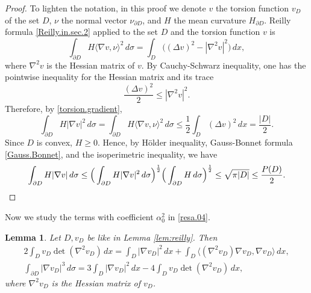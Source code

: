 \documentclass[10pt,reqno,a4paper]{article}
\numberwithin{equation}{section}
\theoremstyle{plain}
\newtheorem{lemma}[theorem]{Lemma}
\theoremstyle{definition}
\newcommand{\la}{\langle}
\newcommand{\ra}{\rangle}
\newcommand{\pa}{\partial}
\newcommand{\grad}{\nabla}
\begin{document}
\begin{proof} 
To lighten the notation, in this proof we denote $v$ the torsion function $v_D$ of the set $D$, 
$\nu$ the normal vector $\nu_{\pa D}$, 
and $H$ the mean curvature $H_{\pa D}$. 
Reilly formula \eqref{Reilly.in.sec.2} applied to the set $D$ 
and the torsion function $v$ is
\[
\int_{\pa D} H \la \grad v, \nu \ra^2\, d\sigma 
= \int_D \Big( (\Delta v)^2 - |\nabla^2 v|^2 \Big) \, dx,
\]
where $\grad^2 v$ is the Hessian matrix of $v$. 
By Cauchy-Schwarz inequality, 
one has the pointwise inequality for the Hessian matrix and its trace 
\[
\frac{(\Delta v)^2}{2} \leq	 |\nabla^2 v|^2.
\]
Therefore, by \eqref{torsion.gradient},
\[
\int_{\pa D} H |\nabla v|^2\, d\sigma 
= \int_{\pa D} H \la \grad v , \nu \ra^2 \, d\sigma 
\leq \frac12 \int_D (\Delta v)^2\, dx
= \frac{|D|}{2}.
\]
Since $D$ is convex, $H \geq 0$.
Hence, by H\"older inequality, Gauss-Bonnet formula \eqref{Gauss.Bonnet}, 
and the isoperimetric inequality, we have
\[
\int_{\pa D} H |\nabla v|\, d\sigma
\leq \Big( \int_{\pa D} H |\nabla v|^2\, d\sigma \Big)^\frac12 
\Big( \int_{\pa D} H \, d\sigma \Big)^\frac12  
\leq \sqrt{\pi |D|}
\leq \frac{P(D)}{2}. 
\qedhere
\]
\end{proof}

Now we study the terms with coefficient $\alpha_0^2$ in \eqref{resa.04}. %

\begin{lemma} \label{lem:det.01}
Let $D, v_D$ be like in Lemma \ref{lem:reilly}. Then 
\begin{gather} \label{int.det.new}
2 \int_D v_D \det(\grad^2 v_D) \, dx
= \int_D |\grad v_D|^2 \, dx
+ \int_D \la (\grad^2 v_D) \grad v_D , \grad v_D \ra \, dx,
\\
\label{eq:determinant}
\int_{\pa D} |\nabla v_D|^3\, d\sigma 
= 3\int_{D} |\nabla v_D|^2\,dx - 4 \int_{D} v_D \det (\nabla^2 v_D) \,dx,
\end{gather}
where $\nabla^2 v_D$ is the Hessian matrix of $v_D$. 
\end{lemma}
\end{document}
